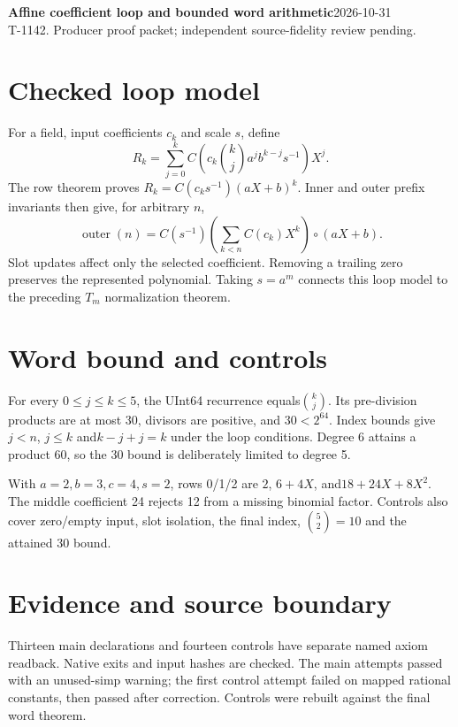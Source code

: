 \documentclass[10pt]{article}
\begin{document}
\textbf{Affine coefficient loop and bounded word arithmetic}\hfill2026-10-31\\T-1142. Producer proof packet; independent source-fidelity review pending.
\section*{Checked loop model}
For a field, input coefficients $c_k$ and scale $s$, define
\[R_k=\sum_{j=0}^{k}C\!\left(c_k\binom{k}{j}a^jb^{k-j}s^{-1}\right)X^j.\]
The row theorem proves $R_k=C(c_ks^{-1})(aX+b)^k$. Inner and outer prefix invariants then give, for arbitrary $n$,
\[\operatorname{outer}(n)=C(s^{-1})\left(\sum_{k<n}C(c_k)X^k\right)\!\circ(aX+b).\]
Slot updates affect only the selected coefficient. Removing a trailing zero preserves the represented polynomial. Taking $s=a^m$ connects this loop model to the preceding $T_m$ normalization theorem.
\begin{center}\end{center}
\section*{Word bound and controls}
For every $0\le j\le k\le5$, the UInt64 recurrence equals$\binom{k}{j}$. Its pre-division products are at most 30, divisors are positive, and $30<2^{64}$. Index bounds give$j<n$, $j\le k$ and$k-j+j=k$ under the loop conditions. Degree 6 attains a product 60, so the 30 bound is deliberately limited to degree 5.

With $a=2,b=3,c=4,s=2$, rows 0/1/2 are $2$, $6+4X$, and$18+24X+8X^2$. The middle coefficient 24 rejects 12 from a missing binomial factor. Controls also cover zero/empty input, slot isolation, the final index, $\binom52=10$ and the attained 30 bound.
\section*{Evidence and source boundary}
Thirteen main declarations and fourteen controls have separate named axiom readback. Native exits and input hashes are checked. The main attempts passed with an unused-simp warning; the first control attempt failed on mapped rational constants, then passed after correction. Controls were rebuilt against the final word theorem.
\end{document}
